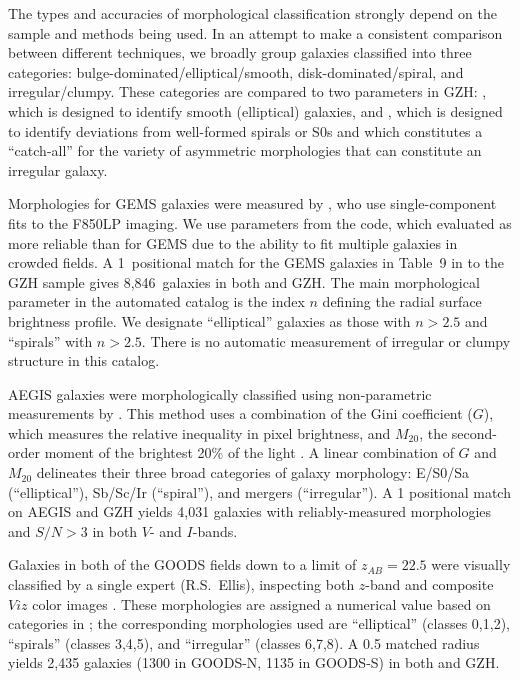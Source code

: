 \documentclass[twocolumn]{aastex6}
\begin{document}
The types and accuracies of morphological classification strongly depend on the sample and methods being used. In an attempt to make a consistent comparison between different techniques, we broadly group galaxies classified into three categories: bulge-dominated/elliptical/smooth, disk-dominated/spiral, and irregular/clumpy. These categories are compared to two parameters in GZH: \pbest, which is designed to identify smooth (elliptical) galaxies, and \podd, which is designed to identify deviations from well-formed spirals or S0s and which constitutes a ``catch-all'' for the variety of asymmetric morphologies that can constitute an irregular galaxy. 

Morphologies for GEMS galaxies were measured by \citet{hau07}, who use single-component \sersic{} fits to the F850LP imaging. We use parameters from the \galfit{} code, which \citet{hau07} evaluated as more reliable than \gimtwod{} for GEMS due to the ability to fit multiple galaxies in crowded fields. A 1\arcsec~positional match for the GEMS galaxies in Table~9 in \citet{hau07} to the GZH sample gives 8,846~galaxies in both \citet{hau07} and GZH. The main morphological parameter in the automated catalog is the \sersic{} index $n$ defining the radial surface brightness profile. We designate ``elliptical'' galaxies as those with $n>2.5$ and ``spirals''  with $n>2.5$. There is no automatic measurement of irregular or clumpy structure in this catalog. 

AEGIS galaxies were morphologically classified using non-parametric measurements by \citet{lot08}. This method uses a combination of the Gini coefficient ($G$), which measures the relative inequality in pixel brightness, and $M_{20}$, the second-order moment of the brightest 20\% of the light \citep{lot04}. A linear combination of $G$ and $M_{20}$ delineates their three broad categories of galaxy morphology: E/S0/Sa (``elliptical''), Sb/Sc/Ir (``spiral''), and mergers (``irregular''). A 1\arcsec{} positional match on AEGIS and GZH yields 4,031 galaxies with reliably-measured morphologies and $S/N>3$ in both $V$- and $I$-bands. 

Galaxies in both of the GOODS fields down to a limit of $z_{AB}=22.5$ were visually classified by a single expert (R.S.~Ellis), inspecting both $z$-band and composite $Viz$ color images \citep{bun05}. These morphologies are assigned a numerical value based on categories in \citet{bri98a}; the corresponding morphologies used are ``elliptical'' (classes 0,1,2), ``spirals'' (classes 3,4,5), and ``irregular'' (classes 6,7,8). A 0.5\arcsec{} matched radius yields 2,435 galaxies (1300 in GOODS-N, 1135 in GOODS-S) in both \citet{bun05} and GZH.  
\end{document}
